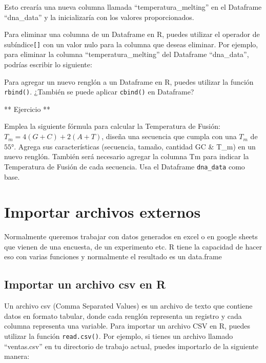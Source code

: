 \documentclass[
]{book}
\newenvironment{Shaded}{\begin{snugshade}}{\end{snugshade}}
\newcommand{\ConstantTok}[1]{\textcolor[rgb]{0.56,0.35,0.01}{#1}}
\newcommand{\NormalTok}[1]{#1}
\newcommand{\OtherTok}[1]{\textcolor[rgb]{0.56,0.35,0.01}{#1}}
\newcommand{\SpecialCharTok}[1]{\textcolor[rgb]{0.81,0.36,0.00}{\textbf{#1}}}
\begin{document}
Esto crearía una nueva columna llamada ``temperatura\_melting'' en el Dataframe ``dna\_data'' y la inicializaría con los valores proporcionados.

Para eliminar una columna de un Dataframe en R, puedes utilizar el operador de subíndice\texttt{{[}{]}} con un valor nulo para la columna que deseas eliminar. Por ejemplo, para eliminar la columna ``temperatura\_melting'' del Dataframe ``dna\_data'', podrías escribir lo siguiente:

\begin{Shaded}
\end{Shaded}

Para agregar un nuevo renglón a un Dataframe en R, puedes utilizar la función \texttt{rbind()}. ¿También se puede aplicar \texttt{cbind()} en Dataframe?

** Ejercicio **

Emplea la siguiente fórmula para calcular la Temperatura de Fusión: \(T_m=4(G+C)+2(A+T)\), diseña una secuencia que cumpla con una \(T_m\) de \(55°\). Agrega sus características (secuencia, tamaño, cantidad GC \& T\_m) en un nuevo renglón. También será necesario agregar la columna Tm para indicar la Temperatura de Fusión de cada secuencia. Usa el Dataframe \texttt{dna\_data} como base.

\section{Importar archivos externos}\label{importar-archivos-externos}

Normalmente queremos trabajar con datos generados en excel o en google sheets que vienen de una encuesta, de un experimento etc. R tiene la capacidad de hacer eso con varias funciones y normalmente el resultado es un data.frame

\subsection{Importar un archivo csv en R}\label{importar-un-archivo-csv-en-r}

Un archivo csv (Comma Separated Values) es un archivo de texto que contiene datos en formato tabular, donde cada renglón representa un registro y cada columna representa una variable. Para importar un archivo CSV en R, puedes utilizar la función \texttt{read.csv()}. Por ejemplo, si tienes un archivo llamado ``ventas.csv'' en tu directorio de trabajo actual, puedes importarlo de la siguiente manera:
\end{document}
